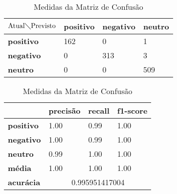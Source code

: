 \begin{table}[h!]
\centering
\begin{minipage}[b]{0.45\linewidth}
\caption{Matriz de Confusão Ternário: \textit{Random Forest}}
\label{tab:mcb-nb}
\begin{tabular}{|l|l|l|l|}
\hline
$\textrm{Atual}\diagdown\textrm{Previsto}$ & \textbf{positivo} & \textbf{negativo} & \textbf{neutro}\\ \hline
\textbf{positivo} & 162 & 0 & 1\\ \hline
\textbf{negativo} & 0 & 313 & 3\\ \hline
\textbf{neutro} & 0 & 0 & 509\\ \hline
\end{tabular}
\end{minipage}
\hspace{0.5cm}
\begin{minipage}[b]{0.45\linewidth}

\centering
\caption{Medidas da Matriz de Confusão}
\label{tab:mmcb-nb}
\begin{tabular}{|l|l|l|l|}
\hline
         & \textbf{precisão} & \textbf{recall} & \textbf{f1-score} \\ \hline
\textbf{positivo} & 1.00     & 0.99   & 1.00     \\ \hline
\textbf{negativo} & 1.00     & 0.99   & 1.00     \\ \hline
\textbf{neutro} & 0.99     & 1.00   & 1.00     \\ \hline
\textbf{média} & 1.00     & 1.00   & 1.00     \\ \hline
\textbf{acurácia} & \multicolumn{3}{|c|}{0.995951417004}\\ \hline
\end{tabular}
\end{minipage}
\end{table}


